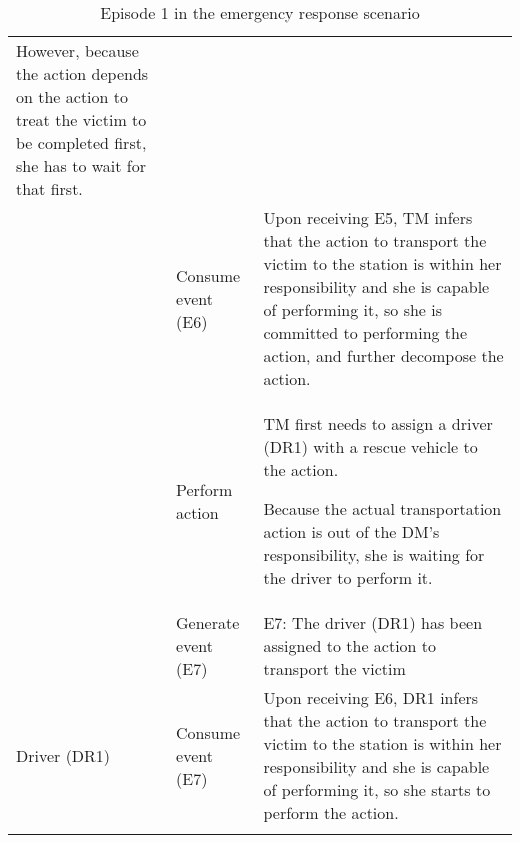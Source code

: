 {\begin{longtable}{>{\raggedright}p{1.2in}>{\raggedright}p{1.2in}>{\raggedright}p{3in}}
However, because the action depends on the action to treat the victim
to be completed first, she has to wait for that first.\tabularnewline
\cmidrule{2-3} 
 & Consume event (E6) & Upon receiving E5, TM infers that the action to transport the victim
to the station is within her responsibility and she is capable of
performing it, so she is committed to performing the action, and further
decompose the action.\tabularnewline
\cmidrule{2-3} 
 & Perform action & TM first needs to assign a driver (DR1) with a rescue vehicle to the
action.

Because the actual transportation action is out of the DM's responsibility,
she is waiting for the driver to perform it.\tabularnewline
\cmidrule{2-3} 
 & Generate event (E7) & E7: The driver (DR1) has been assigned to the action to transport
the victim \tabularnewline
\midrule 
Driver (DR1) & Consume event (E7) & Upon receiving E6, DR1 infers that the action to transport the victim
to the station is within her responsibility and she is capable of
performing it, so she starts to perform the action.\tabularnewline
\bottomrule
\caption{Episode 1 in the emergency response scenario}
\label{tab:episode_1_appendix}
\end{longtable}
}


